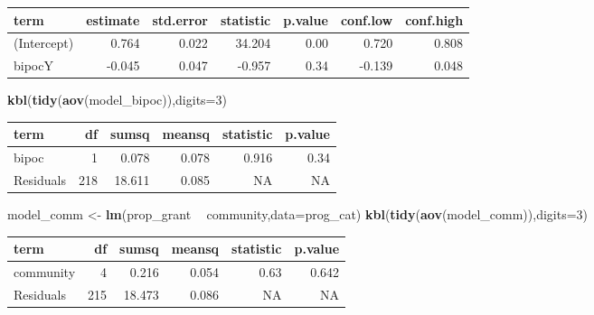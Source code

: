 \documentclass[]{article}
\newenvironment{Shaded}{\begin{snugshade}}{\end{snugshade}}
\newcommand{\DataTypeTok}[1]{\textcolor[rgb]{0.13,0.29,0.53}{#1}}
\newcommand{\DecValTok}[1]{\textcolor[rgb]{0.00,0.00,0.81}{#1}}
\newcommand{\KeywordTok}[1]{\textcolor[rgb]{0.13,0.29,0.53}{\textbf{#1}}}
\newcommand{\NormalTok}[1]{#1}
\newcommand{\OperatorTok}[1]{\textcolor[rgb]{0.81,0.36,0.00}{\textbf{#1}}}
\newcommand{\StringTok}[1]{\textcolor[rgb]{0.31,0.60,0.02}{#1}}
\begin{document}
\begin{tabular}[t]{l|r|r|r|r|r|r}
\hline
term & estimate & std.error & statistic & p.value & conf.low & conf.high\\
\hline
(Intercept) & 0.764 & 0.022 & 34.204 & 0.00 & 0.720 & 0.808\\
\hline
bipocY & -0.045 & 0.047 & -0.957 & 0.34 & -0.139 & 0.048\\
\hline
\end{tabular}

\begin{Shaded}
\begin{Highlighting}[]
\KeywordTok{kbl}\NormalTok{(}\KeywordTok{tidy}\NormalTok{(}\KeywordTok{aov}\NormalTok{(model_bipoc)),}\DataTypeTok{digits=}\DecValTok{3}\NormalTok{)}
\end{Highlighting}
\end{Shaded}

\begin{tabular}[t]{l|r|r|r|r|r}
\hline
term & df & sumsq & meansq & statistic & p.value\\
\hline
bipoc & 1 & 0.078 & 0.078 & 0.916 & 0.34\\
\hline
Residuals & 218 & 18.611 & 0.085 & NA & NA\\
\hline
\end{tabular}

\begin{Shaded}
\begin{Highlighting}[]
\NormalTok{model_comm <-}\StringTok{ }\KeywordTok{lm}\NormalTok{(prop_grant }\OperatorTok{~}\StringTok{ }\NormalTok{community,}\DataTypeTok{data=}\NormalTok{prog_cat)}
\KeywordTok{kbl}\NormalTok{(}\KeywordTok{tidy}\NormalTok{(}\KeywordTok{aov}\NormalTok{(model_comm)),}\DataTypeTok{digits=}\DecValTok{3}\NormalTok{)}
\end{Highlighting}
\end{Shaded}

\begin{tabular}[t]{l|r|r|r|r|r}
\hline
term & df & sumsq & meansq & statistic & p.value\\
\hline
community & 4 & 0.216 & 0.054 & 0.63 & 0.642\\
\hline
Residuals & 215 & 18.473 & 0.086 & NA & NA\\
\hline
\end{tabular}
\end{document}

